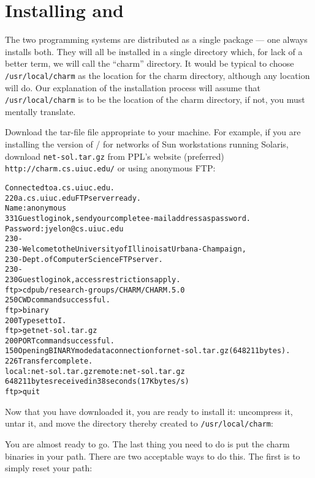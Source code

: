 \section{Installing \converse{} and \charmpp{}}

The two programming systems are distributed as a single package ---
one always installs both.  They will all be installed in a single
directory which, for lack of a better term, we will call the ``charm''
directory.  It would be typical to choose {\tt /usr/local/charm} as
the location for the charm directory, although any location will do.
Our explanation of the installation process will assume that {\tt
/usr/local/charm} is to be the location of the charm directory,
if not, you must mentally translate.

Download the tar-file file appropriate to your machine.  For example,
if you are installing the version of \converse{}/\charmpp{} for networks of Sun
workstations running Solaris, download {\tt net-sol.tar.gz} from PPL's
website (preferred) {\tt http://charm.cs.uiuc.edu/} or using anonymous FTP:

\begin{alltt}
    % ftp a.cs.uiuc.edu
    Connected to a.cs.uiuc.edu.
    220 a.cs.uiuc.edu FTP server ready.
    Name: anonymous
    331 Guest login ok, send your complete e-mail address as password.
    Password: jyelon@cs.uiuc.edu
    230-
    230-    Welcome to the University of Illinois at Urbana-Champaign,
    230-                 Dept. of Computer Science FTP server.
    230-
    230 Guest login ok, access restrictions apply.
    ftp> cd pub/research-groups/CHARM/CHARM.5.0
    250 CWD command successful.
    ftp> binary
    200 Type set to I.
    ftp> get net-sol.tar.gz
    200 PORT command successful.
    150 Opening BINARY mode data connection for net-sol.tar.gz (648211 bytes).
    226 Transfer complete.
    local: net-sol.tar.gz remote: net-sol.tar.gz
    648211 bytes received in 38 seconds (17 Kbytes/s)
    ftp> quit
\end{alltt}

Now that you have downloaded it, you are ready to install it: uncompress it,
untar it, and move the directory thereby created to {\tt /usr/local/charm}:

\begin{alltt}
    % gunzip net-sol.tar.gz
    % tar xf net-sol.tar
    % mv net-sol/* /usr/local/charm
\end{alltt}

You are almost ready to go.  The last thing you need to do is put the
charm binaries in your path.  There are two acceptable ways to do
this.  The first is to simply reset your path:

